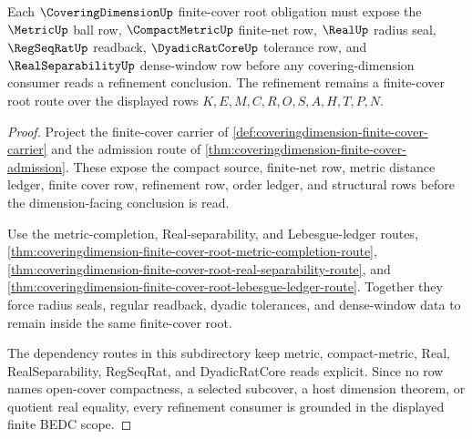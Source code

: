 \begin{theorem}
\label{thm:covering-dimension-finite-cover-scope-grounding}
Each $\CoveringDimensionUp$ finite-cover root obligation must expose the $\MetricUp$ ball row, $\CompactMetricUp$ finite-net row, $\RealUp$ radius seal, $\RegSeqRatUp$ readback, $\DyadicRatCoreUp$ tolerance row, and $\RealSeparabilityUp$ dense-window row before any covering-dimension consumer reads a refinement conclusion. The refinement remains a finite-cover root route over the displayed rows $K,E,M,C,R,O,S,A,H,T,P,N$.
\end{theorem}
\begin{proof}
Project the finite-cover carrier of \autoref{def:coveringdimension-finite-cover-carrier} and the admission route of \autoref{thm:coveringdimension-finite-cover-admission}. These expose the compact source, finite-net row, metric distance ledger, finite cover row, refinement row, order ledger, and structural rows before the dimension-facing conclusion is read.

Use the metric-completion, Real-separability, and Lebesgue-ledger routes, \autoref{thm:coveringdimension-finite-cover-root-metric-completion-route}, \autoref{thm:coveringdimension-finite-cover-root-real-separability-route}, and \autoref{thm:coveringdimension-finite-cover-root-lebesgue-ledger-route}. Together they force radius seals, regular readback, dyadic tolerances, and dense-window data to remain inside the same finite-cover root.

The dependency routes in this subdirectory keep metric, compact-metric, Real, RealSeparability, RegSeqRat, and DyadicRatCore reads explicit. Since no row names open-cover compactness, a selected subcover, a host dimension theorem, or quotient real equality, every refinement consumer is grounded in the displayed finite BEDC scope.
\end{proof}
